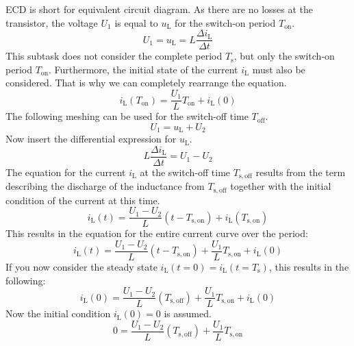 \begin{solutionblock}
    
    ECD is short for equivalent circuit diagram.
    As there are no losses at the transistor, the voltage $U_{\mathrm{1}}$ is equal to $u_{\mathrm{L}}$ for the switch-on period $T_{\mathrm{on}}$.
    \begin{equation}
        U_{\mathrm{1}} = u_{\mathrm{L}} = L \frac{\Delta i_{\mathrm{L}} }{\Delta t} 
    \end{equation}
    This subtask does not consider the complete period $T_{\mathrm{s}}$, but only the switch-on period $T_{\mathrm{on}}$. Furthermore, the initial state of the current $i_{\mathrm{L}}$ must also be considered.
    That is why we can completely rearrange the equation.
    \begin{equation}
        i_{\mathrm{L}}(T_{\mathrm{on}}) =  \frac{U_{\mathrm{1}} }{L}T_{\mathrm{on}} +  i_{\mathrm{L}}(0)
    \end{equation}
    The following meshing can be used for the switch-off time $T_{\mathrm{off}}$.
    \begin{equation}
        U_{\mathrm{1}} = u_{\mathrm{L}} + U_{\mathrm{2}}
    \end{equation}
    Now insert the differential expression for $u_{\mathrm{L}}$. 
    \begin{equation}
        L \frac{\Delta i_{\mathrm{L}} }{\Delta t} = U_{\mathrm{1}} - U_{\mathrm{2}}
    \end{equation}
    The equation for the current $i_{\mathrm{L}}$ at the switch-off time $T_{\mathrm{s,off}}$ results from the term describing the discharge of the inductance from $T_{\mathrm{s,off}}$ together with the initial condition of the current at this time.
    \begin{equation}
        i_{\mathrm{L}}(t) = \frac{U_{\mathrm{1}}-U_{\mathrm{2}} }{L} (t-T_{\mathrm{s,on}})+i_{\mathrm{L}}(T_{\mathrm{s,on}})
    \end{equation}
    This results in the equation for the entire current curve over the period: 
    \begin{equation}
        i_{\mathrm{L}}(t) = \frac{U_{\mathrm{1}}-U_{\mathrm{2}} }{L} (t-T_{\mathrm{s,on}})+\frac{U_{\mathrm{1}}}{L}T_{\mathrm{s,on}}+i_{\mathrm{L}}(0)
    \end{equation}
    If you now consider the steady state $i_{\mathrm{L}}(t=0)=i_{\mathrm{L}}(t=T_{\mathrm{s}})$, this results in the following:
    \begin{equation}
        i_{\mathrm{L}}(0) = \frac{U_{\mathrm{1}}-U_{\mathrm{2}} }{L} (T_{\mathrm{s,off}})+\frac{U_{\mathrm{1}}}{L}T_{\mathrm{s,on}}+i_{\mathrm{L}}(0)
    \end{equation}
    Now the initial condition $i_{\mathrm{L}}(0)=0$ is assumed.
    \begin{equation}
        0 = \frac{U_{\mathrm{1}}-U_{\mathrm{2}} }{L} (T_{\mathrm{s,off}})+\frac{U_{\mathrm{1}}}{L}T_{\mathrm{s,on}}
    \end{equation}


\end{solutionblock}
